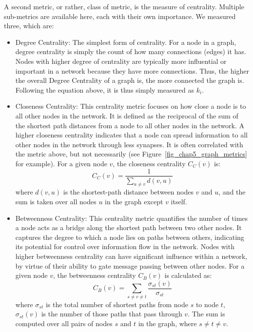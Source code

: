 A second metric, or rather, class of metric, is the measure of centrality. Multiple sub-metrics are available here, each with their own importance. We measured three, which are:
\begin{itemize}
    \item Degree Centrality: The simplest form of centrality. For a node in a graph, degree centrality is simply the count of how many connections (edges) it has. Nodes with higher degree of centrality are typically more influential or important in a network because they have more connections. Thus, the higher the overall Degree Centrality of a graph is, the more connected the graph is. Following the equation above, it is thus simply measured as $k_i$.
    
    \item Closeness Centrality: This centrality metric focuses on how close a node is to all other nodes in the network. It is defined as the reciprocal of the sum of the shortest path distances from a node to all other nodes in the network. A higher closeness centrality indicates that a node can spread information to all other nodes in the network through less synapses. It is often correlated with the metric above, but not necessarily (see Figure~\ref{fig_chap5_graph_metrics} for example). For a given node \( v \), the closeness centrality \( C_C(v) \) is:
    \begin{equation}
        C_C(v) = \frac{1}{\sum_{u \neq v} d(v, u)}
    \end{equation}
    where \( d(v, u) \) is the shortest-path distance between nodes \( v \) and \( u \), and the sum is taken over all nodes \( u \) in the graph except \( v \) itself.
    
    \item Betweenness Centrality: This centrality metric quantifies the number of times a node acts as a bridge along the shortest path between two other nodes. It captures the degree to which a node lies on paths between others, indicating its potential for control over information flow in the network. Nodes with higher betweenness centrality can have significant influence within a network, by virtue of their ability to gate message passing between other nodes. For a given node \( v \), the betweenness centrality \( C_B(v) \) is calculated as:
    \begin{equation}
        C_B(v) = \sum_{s \neq v \neq t} \frac{\sigma_{st}(v)}{\sigma_{st}}
    \end{equation}
    where \( \sigma_{st} \) is the total number of shortest paths from node \( s \) to node \( t \), \( \sigma_{st}(v) \) is the number of those paths that pass through \( v \). The sum is computed over all pairs of nodes \( s \) and \( t \) in the graph, where \( s \neq t \neq v \).
\end{itemize}

